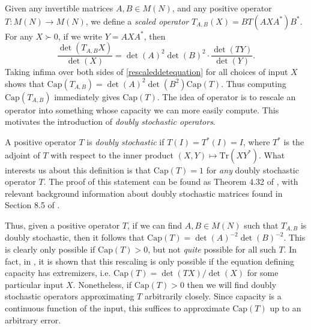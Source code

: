 \documentclass[12pt]{article}
\begin{document}
Given any invertible matrices $A,B \in M(N)$, and any positive operator $T: M(N) \to M(N)$, we define a \emph{scaled operator} $T_{A,B}(X) = B T(A X A^*) B^*$. For any $X \succ 0$, if we write $Y = AXA^*$, then
%
\begin{equation} \label{rescaleddetequation}
    \frac{\det(T_{A,B} X)}{\det(X)} = \det(A)^2 \det(B)^2 \cdot \frac{\det(TY)}{\det(Y)}.
\end{equation}
%
Taking infima over both sides of \eqref{rescaleddetequation} for all choices of input $X$ shows that $\text{Cap}(T_{A,B}) = \det(A)^2 \det(B^2) \text{Cap}(T)$. Thus computing $\text{Cap}(T_{A,B})$ immediately gives $\text{Cap}(T)$. The idea of operator is to rescale an operator into something whose capacity we can more easily compute. This motivates the introduction of \emph{doubly stochastic operators}.

A positive operator $T$ is \emph{doubly stochastic} if $T(I) = T^*(I) = I$, where $T^*$ is the adjoint of $T$ with respect to the inner product $(X,Y) \mapsto \text{Tr}(XY^*)$. What interests us about this definition is that $\text{Cap}(T) = 1$ for \emph{any} doubly stochastic operator $T$. The proof of this statement can be found as Theorem 4.32 of \cite{watrous}, with relevant background information about doubly stochastic matrices found in Section 8.5 of \cite{serre}.

Thus, given a positive operator $T$, if we can find $A,B \in M(N)$ such that $T_{A,B}$ is doubly stochastic, then it follows that $\text{Cap}(T) = \det(A)^{-2} \det(B)^{-2}$. This is clearly only possible if $\text{Cap}(T) > 0$, but not \emph{quite} possible for all such $T$. In fact, in \cite{ostaa}, it is shown that this rescaling is only possible if the equation defining capacity has extremizers, i.e. $\text{Cap}(T) = \det(TX)/\det(X)$ for some particular input $X$. Nonetheless, if $\text{Cap}(T) > 0$ then we will find doubly stochastic operators approximating $T$ arbitrarily closely. Since capacity is a continuous function of the input, this suffices to approximate $\text{Cap}(T)$ up to an arbitrary error.

\end{document}
